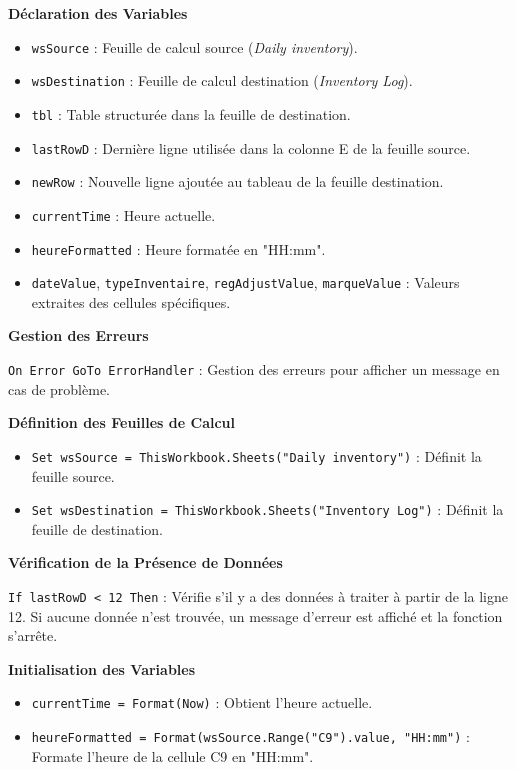\documentclass[a4paper, oneside, 12pt, final]{extreport}
\begin{document}
\textbf{Déclaration des Variables}

\begin{itemize}
    \item \texttt{wsSource} : Feuille de calcul source (\textit{Daily inventory}).
    \item \texttt{wsDestination} : Feuille de calcul destination (\textit{Inventory Log}).
    \item \texttt{tbl} : Table structurée dans la feuille de destination.
    \item \texttt{lastRowD} : Dernière ligne utilisée dans la colonne E de la feuille source.
    \item \texttt{newRow} : Nouvelle ligne ajoutée au tableau de la feuille destination.
    \item \texttt{currentTime} : Heure actuelle.
    \item \texttt{heureFormatted} : Heure formatée en "HH:mm".
    \item \texttt{dateValue}, \texttt{typeInventaire}, \texttt{regAdjustValue}, \texttt{marqueValue} : Valeurs extraites des cellules spécifiques.
\end{itemize}

\textbf{Gestion des Erreurs}

\texttt{On Error GoTo ErrorHandler} : Gestion des erreurs pour afficher un message en cas de problème.

\textbf{Définition des Feuilles de Calcul}

\begin{itemize}
    \item \texttt{Set wsSource = ThisWorkbook.Sheets("Daily inventory")} : Définit la feuille source.
    \item \texttt{Set wsDestination = ThisWorkbook.Sheets("Inventory Log")} : Définit la feuille de destination.
\end{itemize}

\textbf{Vérification de la Présence de Données}

\texttt{If lastRowD < 12 Then} : Vérifie s'il y a des données à traiter à partir de la ligne 12. Si aucune donnée n'est trouvée, un message d'erreur est affiché et la fonction s'arrête.

\textbf{Initialisation des Variables}

\begin{itemize}
    \item \texttt{currentTime = Format(Now)} : Obtient l'heure actuelle.
    \item \texttt{heureFormatted = Format(wsSource.Range("C9").value, "HH:mm")} : Formate l'heure de la cellule C9 en "HH:mm".
\end{itemize}
\end{document}
